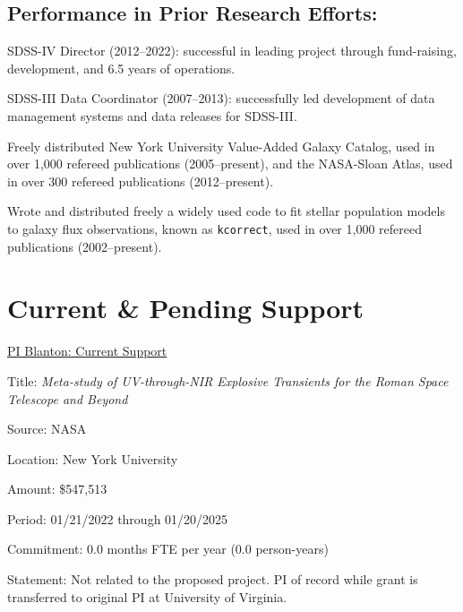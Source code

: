 \documentclass[12pt, preprint]{hacked-aastex}
\newenvironment{ditemize}
{ \begin{list}{}{%
\setlength{\topsep}{0pt}%
\setlength{\partopsep}{3pt}%
\setlength{\itemsep}{1pt}\setlength{\parsep}{1pt}%
\setlength{\itemindent}{0pt}\setlength{\listparindent}{12pt}%
\setlength{\leftmargin}{24pt}\setlength{\rightmargin}{0in}%
\setlength{\labelsep}{6pt}\setlength{\labelwidth}{6pt}%
\renewcommand{\makelabel}{\makebox[\labelwidth][l]{$\bullet$\hspace{\fill}}}}}
{\end{list}}
\begin{document}
\vspace{-8pt}
\subsection*{\normalsize Performance in
  Prior Research Efforts:}
\begin{ditemize}\setlength{\itemsep}{0pt}
\item SDSS-IV Director (2012--2022): successful in leading project
  through fund-raising, development, and 6.5 years of operations. 
\item SDSS-III Data Coordinator (2007--2013): successfully led
  development of data management systems and data releases for
  SDSS-III.
\item Freely distributed New York University Value-Added Galaxy
  Catalog, used in over 1,000 refereed publications (2005--present), and
  the NASA-Sloan Atlas, used in over 300 refereed publications
  (2012--present).
\item Wrote and distributed freely a widely used code to fit stellar
  population models to galaxy flux observations, known as
  \texttt{kcorrect}, used in over 1,000 refereed publications
  (2002--present).
\end{ditemize}


\clearpage
\section{Current \& Pending Support}\label{sec:support}

\noindent \underline{PI Blanton: Current Support}

\begin{itemize*}
\item[]{Title: {\em Meta-study of UV-through-NIR Explosive Transients for the Roman Space
Telescope and Beyond}}
\item[]{Source: NASA}
\item[]{Location: New York University}
\item[]{Amount: \$547,513}
\item[]{Period: 01/21/2022 through 01/20/2025}
\item[]{Commitment: 0.0 months FTE per year (0.0 person-years)}
\item[]{Statement: Not related to the proposed project. PI of record while
grant is transferred to original PI at University of Virginia.}
\end{itemize*}
\end{document}
